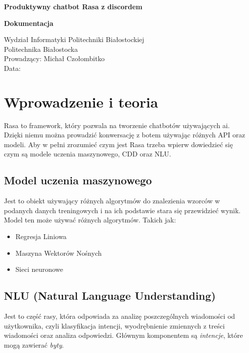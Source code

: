 \documentclass{article}
\begin{document}
\begin{titlepage}
   \begin{center}
       \textbf{Produktywny chatbot Rasa z discordem}

       \textbf{Dokumentacja}


            
        \vspace{15cm}          
     
            
       Wydział Informatyki Politechniki Białostockiej\\
       Politechnika Białostocka\\
       Prowadzący: Michał Czołombitko\\
       Data:
            
   \end{center}
\end{titlepage}

\tableofcontents

\section{Wprowadzenie i teoria}
Rasa to framework, który pozwala na tworzenie chatbotów używających ai. Dzięki
niemu można prowadzić konwersację z botem używając różnych API oraz modeli. Aby
w pełni zrozumieć czym jest Rasa trzeba wpierw dowiedzieć się czym są modele
uczenia maszynowego, CDD oraz NLU.

\subsection{Model uczenia maszynowego}
Jest to obiekt używający różnych algorytmów do znalezienia wzorców w podanych
danych treningowych i na ich podstawie stara się przewidzieć wynik. Model ten
może używać różnych algorytmów. Takich jak:
\begin{itemize}
    \item[\textcolor{violet}{\textbullet}] Regresja Liniowa
    \item[\textcolor{violet}{\textbullet}] Maszyna Wektorów Nośnych
    \item[\textcolor{violet}{\textbullet}] Sieci neuronowe
\end{itemize}

\subsection{NLU (Natural Language Understanding)}
Jest to część rasy, która odpowiada za analizę poszczególnych wiadomości od 
użytkownika, czyli klasyfikacja intencji, wyodrębnienie zmiennych z treści
wiadomości oraz analiza odpowiedzi. Głównym komponentem są \emph{intencje},
które mogą zawierać \emph{byty}.
\end{document}
